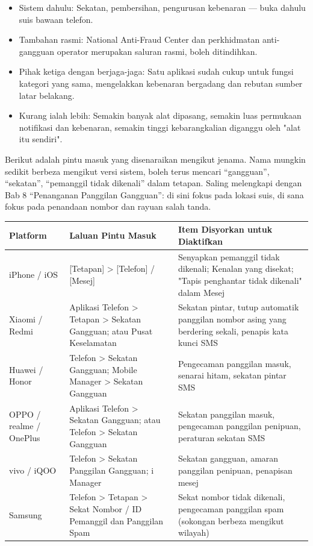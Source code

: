 \begin{itemize}
  \item Sistem dahulu: Sekatan, pembersihan, pengurusan kebenaran — buka dahulu suis bawaan telefon.
  \item Tambahan rasmi: National Anti-Fraud Center dan perkhidmatan anti-gangguan operator merupakan saluran rasmi, boleh ditindihkan.
  \item Pihak ketiga dengan berjaga-jaga: Satu aplikasi sudah cukup untuk fungsi kategori yang sama, mengelakkan kebenaran bergadang dan rebutan sumber latar belakang.
  \item Kurang ialah lebih: Semakin banyak alat dipasang, semakin luas permukaan notifikasi dan kebenaran, semakin tinggi kebarangkalian diganggu oleh "alat itu sendiri".
\end{itemize}


Berikut adalah pintu masuk yang disenaraikan mengikut jenama. Nama mungkin sedikit berbeza mengikut versi sistem, boleh terus mencari “gangguan”, “sekatan”, “pemanggil tidak dikenali” dalam tetapan. Saling melengkapi dengan Bab 8 “Penanganan Panggilan Gangguan”: di sini fokus pada lokasi suis, di sana fokus pada penandaan nombor dan rayuan salah tanda.

\begin{center}
\begin{tabularx}{\linewidth}{|X|X|X|}
\hline
\textbf{Platform} & \textbf{Laluan Pintu Masuk} & \textbf{Item Disyorkan untuk Diaktifkan} \tabularnewline
\hline
iPhone / iOS & {}[Tetapan] > [Telefon] / [Mesej] & Senyapkan pemanggil tidak dikenali; Kenalan yang disekat; "Tapis penghantar tidak dikenali" dalam Mesej \tabularnewline
Xiaomi / Redmi & Aplikasi Telefon > Tetapan > Sekatan Gangguan; atau Pusat Keselamatan & Sekatan pintar, tutup automatik panggilan nombor asing yang berdering sekali, penapis kata kunci SMS \tabularnewline
Huawei / Honor & Telefon > Sekatan Gangguan; Mobile Manager > Sekatan Gangguan & Pengecaman panggilan masuk, senarai hitam, sekatan pintar SMS \tabularnewline
OPPO / realme / OnePlus & Aplikasi Telefon > Sekatan Gangguan; atau Telefon > Sekatan Gangguan & Sekatan panggilan masuk, pengecaman panggilan penipuan, peraturan sekatan SMS \tabularnewline
vivo / iQOO & Telefon > Sekatan Panggilan Gangguan; i Manager & Sekatan gangguan, amaran panggilan penipuan, penapisan mesej \tabularnewline
Samsung & Telefon > Tetapan > Sekat Nombor / ID Pemanggil dan Panggilan Spam & Sekat nombor tidak dikenali, pengecaman panggilan spam (sokongan berbeza mengikut wilayah) \tabularnewline
\hline
\end{tabularx}
\end{center}

